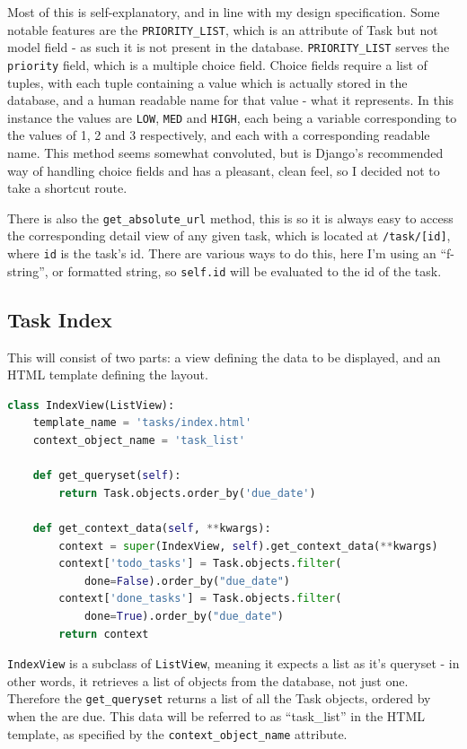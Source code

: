 \documentclass{article}
\begin{document}
Most of this is self-explanatory, and in line with my design specification.
Some notable features are the \texttt{PRIORITY\_LIST},
which is an attribute of Task but not model field -
as such it is not present in the database.
\texttt{PRIORITY\_LIST} serves the \texttt{priority} field,
which is a multiple choice field.
Choice fields require a list of tuples,
with each tuple containing a value which is actually stored in the database,
and a human readable name for that value - what it represents.
In this instance the values are \texttt{LOW}, \texttt{MED} and \texttt{HIGH},
each being a variable corresponding to the values of 1, 2 and 3 respectively,
and each with a corresponding readable name.
This method seems somewhat convoluted,
but is Django's recommended way of handling choice fields and has a pleasant, clean feel,
so I decided not to take a shortcut route.

There is also the \texttt{get\_absolute\_url} method,
this is so it is always easy to access the corresponding detail view of any given task,
which is located at \texttt{/task/[id]}, where \texttt{id} is the task's id.
There are various ways to do this,
here I'm using an ``f-string'',
or formatted string,
so \texttt{{self.id}} will be evaluated to the id of the task.

\subsection{Task Index}
This will consist of two parts:
a view defining the data to be displayed,
and an HTML template defining the layout.

\begin{lstlisting}[language=Python, breaklines]
class IndexView(ListView):
    template_name = 'tasks/index.html'
    context_object_name = 'task_list'

    def get_queryset(self):
        return Task.objects.order_by('due_date')

    def get_context_data(self, **kwargs):
        context = super(IndexView, self).get_context_data(**kwargs)
        context['todo_tasks'] = Task.objects.filter(
            done=False).order_by("due_date")
        context['done_tasks'] = Task.objects.filter(
            done=True).order_by("due_date")
        return context
\end{lstlisting}

\texttt{IndexView} is a subclass of \texttt{ListView},
meaning it expects a list as it's queryset -
in other words,
it retrieves a list of objects from the database,
not just one.
Therefore the \texttt{get\_queryset} returns a list of all the Task objects,
ordered by when the are due.
This data will be referred to as ``task\_list'' in the HTML template,
as specified by the \texttt{context\_object\_name} attribute.
\end{document}
